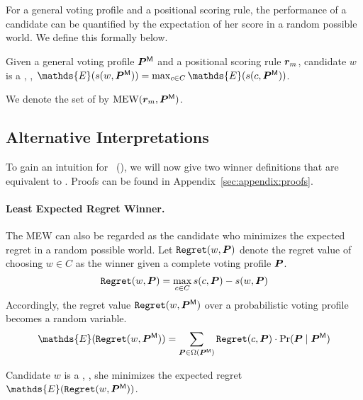 \section{\mEw}
\label{sec:mew}

For a general voting profile and a positional scoring rule, the performance of a candidate can be quantified by the expectation of her score in a random possible world.  We define this formally below.

\begin{definition} [\mew] \label{def:mew}
  Given a general voting profile $\bm{P}^{\mathsf{M}}$ and a positional scoring rule $\bm{r}_m$, candidate $w$ is a \mEw, \ifff, $\mathds{E}(\score(w, \probaVP)) = \max_{c \in C} \mathds{E}(\score(c, \probaVP))$.
\end{definition}

We denote the set of \mEws by $\text{MEW}(\bm{r}_m, \bm{P}^{\mathsf{M}})$.

\subsection{Alternative Interpretations}
\label{sec:mew:alternative_interpretations}

To gain an intuition for \mEw~(\mew), we will now give two winner definitions that are equivalent to \mew. Proofs can be found in Appendix~\ref{sec:appendix:proofs}.

\paragraph{Least Expected Regret Winner.}

The MEW can also be regarded as the candidate who minimizes the expected regret in a random possible world.
Let $\texttt{Regret}(w, \bm{P})$ denote the regret value of choosing $w \in C$ as the winner given a complete voting profile $\bm{P}$.
\[
\texttt{Regret}(w, \bm{P}) = \max_{c \in C} s(c, \bm{P}) - s(w, \bm{P})
\]
Accordingly, the regret value $\texttt{Regret}(w, \bm{P}^{\mathsf{M}})$ over a probabilistic voting profile becomes a random variable.
\[
\mathds{E}(\txt{Regret}(w, \probaVP)) = \sum_{\completeVP \in \Omega(\probaVP)} \txt{Regret}(c, \completeVP) \cdot \Pr(\completeVP \mid \probaVP)
\]

Candidate $w$ is a , \ifff, she minimizes the expected regret $\mathds{E}(\txt{Regret}(w, \probaVP))$.

\def\theoremLeastExpectedRegretWinner{
  Least Expected Regret Winner is equivalent to \mew.
}

